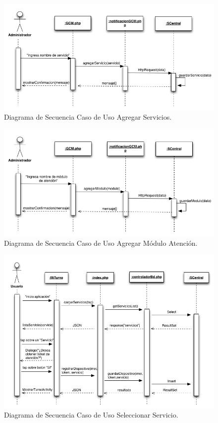 \begin{figure}[H]
\centering
\includegraphics[scale=0.65]{images/capitulo4/dsAgregarServicio.png}
\caption{Diagrama de Secuencia Caso de Uso Agregar Servicios.}
\label{dsCUAS}
\end{figure}

\begin{figure}[H]
\centering
\includegraphics[scale=0.65]{images/capitulo4/dsAgregarModulo.png}
\caption{Diagrama de Secuencia Caso de Uso Agregar Módulo Atención.}
\label{dsCUAMA}
\end{figure}

\begin{figure}[H]
\centering
\includegraphics[scale=0.60]{images/capitulo4/dsSeleccionarServicio.png}
\caption{Diagrama de Secuencia Caso de Uso Seleccionar Servicio.}
\label{dsCUSS}
\end{figure}

